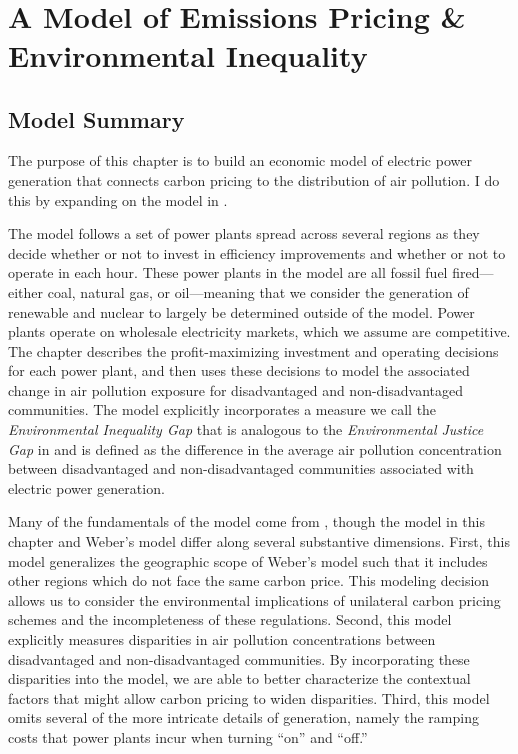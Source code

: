 ~
\newpage
\section{A Model of Emissions Pricing \& Environmental Inequality}

\subsection{Model Summary}

The purpose of this chapter is to build an economic model of electric power generation that connects carbon pricing to the distribution of air pollution. I do this by expanding on the model in \cite{weber2021dynamic}. 

The model follows a set of power plants spread across several regions as they decide whether or not to invest in efficiency improvements and whether or not to operate in each hour. These power plants in the model are all fossil fuel fired---either coal, natural gas, or oil---meaning that we consider the generation of renewable and nuclear to largely be determined outside of the model. Power plants operate on wholesale electricity markets, which we assume are competitive. The chapter describes the profit-maximizing investment and operating decisions for each power plant, and then uses these decisions to model the associated change in air pollution exposure for disadvantaged and non-disadvantaged communities. The model explicitly incorporates a measure we call the \emph{Environmental Inequality Gap} that is analogous to the \emph{Environmental Justice Gap} in \cite{hernandez2023environmental} and is defined as the difference in the average air pollution concentration between disadvantaged and non-disadvantaged communities associated with electric power generation.  

Many of the fundamentals of the model come from \cite{weber2021dynamic}, though the model in this chapter and Weber's model differ along several substantive dimensions. First, this model generalizes the geographic scope of Weber's model such that it includes other regions which do not face the same carbon price. This modeling decision allows us to consider the environmental implications of unilateral carbon pricing schemes and the incompleteness of these regulations. Second, this model explicitly measures disparities in air pollution concentrations between disadvantaged and non-disadvantaged communities. By incorporating these disparities into the model, we are able to better characterize the contextual factors that might allow carbon pricing to widen disparities. Third, this model omits several of the more intricate details of generation, namely the ramping costs that power plants incur when turning ``on'' and ``off.''

